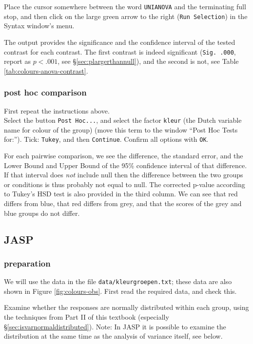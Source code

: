 \documentclass[
]{book}
\begin{document}
Place the cursor somewhere between the word \texttt{UNIANOVA} and the terminating
full stop, and then click on the large green arrow to the right (\texttt{Run\ Selection})
in the Syntax window's menu.

The output provides the significance and the confidence interval
of the tested contrast for each contrast. The first contrast
is indeed significant (\texttt{Sig.\ .000}, report as \(p<.001\), see
§\ref{sec:plargerthannull}), and the second is not, see
Table \ref{tab:colours-anova-contrast}.

\subsubsection{post hoc comparison}\label{post-hoc-comparison}

First repeat the instructions above.\\
Select the button \texttt{Post\ Hoc...}, and select the factor \texttt{kleur}
(the Dutch variable name for colour of the group) (move this term to the window ``Post Hoc Tests for:'').
Tick: \texttt{Tukey}, and then \texttt{Continue}. Confirm all options with \texttt{OK}.

For each pairwise comparison, we see the difference, the
standard error, and the Lower Bound and Upper Bound of the 95\%
confidence interval of that difference. If that interval does \emph{not}
include null then the difference between the two groups or conditions is
thus probably not equal to null. The corrected p-value according to Tukey's
HSD test is also provided in the third column. We can see that red
differs from blue, that red differs from grey, and that the scores of the
grey and blue groups do not differ.

\subsection{JASP}\label{jasp-13}

\subsubsection{preparation}\label{preparation-2}

We will use the data in the file \texttt{data/kleurgroepen.txt}; these data are also shown in Figure \ref{fig:colours-obs}.
First read the required data, and check this.

Examine whether the responses are normally distributed within each group, using the
techniques from Part II of this textbook (especially
§\ref{sec:isvarnormaldistributed}).
Note: In JASP it is possible to examine the distribution at the same time as the analysis of variance itself, see below.
\end{document}
